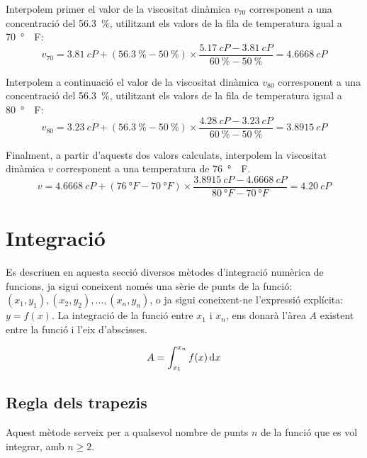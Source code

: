 \begin{exemple}
    Interpolem primer el valor de la viscositat dinàmica $v_{70}$ corresponent a una concentració del \SI{56,3}{\percent}, utilitzant els valors de la fila de temperatura igual a  \SI{70}{\degree{}F}:
    \[
         v_{70}=\SI{3,81}{cP}+(\SI{56,3}{\percent}-\SI{50}{\percent})\times
         \frac{\SI{5,17}{cP}-\SI{3,81}{cP}}{\SI{60}{\percent}-\SI{50}{\percent}}=\SI{4,6668}{cP}
    \]

    Interpolem a continuació el valor de la viscositat dinàmica $v_{80}$ corresponent a una concentració del \SI{56,3}{\percent}, utilitzant els valors de la fila de temperatura igual a  \SI{80}{\degree{}F}:
    \[
         v_{80} =\SI{3,23}{cP}+(\SI{56,3}{\percent}-\SI{50}{\percent})\times
         \frac{\SI{4,28}{cP}-\SI{3,23}{cP}}{\SI{60}{\percent}-\SI{50}{\percent}}=\SI{3,8915}{cP}
    \]

    Finalment, a partir d'aquests dos valors calculats, interpolem la viscositat dinàmica $v$ corresponent  a una temperatura de
    \SI{76}{\degree{}F}.
    \[
         v =\SI{4,6668}{cP}+(\SI{76}{\degree{}F}-\SI{70}{\degree{}F})\times
         \frac{\SI{3,8915}{cP}-\SI{4,6668}{cP}}{\SI{80}{\degree{}F}-\SI{70}{\degree{}F}}=\SI{4,20}{cP}
    \]

\end{exemple}

\section{Integració}\label{sec:int-mum}

Es descriuen en aquesta secció diversos mètodes d'integració numèrica de funcions, ja sigui coneixent només una sèrie de punts de la funció: $(x_1, y_1), (x_2, y_2), \dots ,(x_n, y_n)$, o ja sigui coneixent-ne l'expressió explícita: $y=f(x)$. La integració de la funció entre $x_1$ i $x_n$, ens donarà l'àrea $A$ existent entre la funció i l'eix d'abscisses.

 \begin{equation}
    A = \int_{x_1}^{x_n} f(x) \diff x
 \end{equation}

\subsection{Regla dels trapezis}

Aquest mètode serveix per a qualsevol nombre de punts $n$ de la funció que es vol integrar, amb $n \geq 2$.

